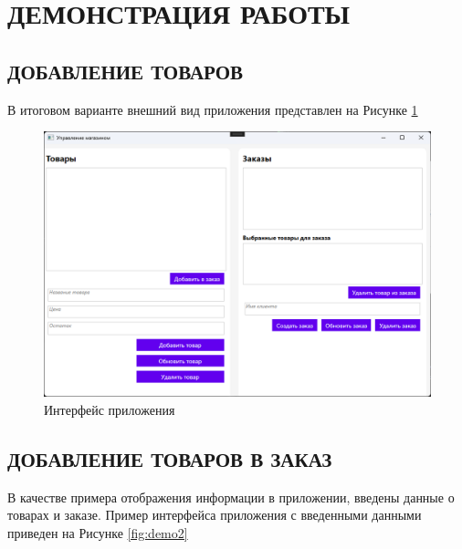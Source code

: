\documentclass[12pt]{article}
\numberwithin{listing}{section}
\numberwithin{figure}{section}
\begin{document}
\pagebreak

\section{ДЕМОНСТРАЦИЯ РАБОТЫ}

\subsection{ДОБАВЛЕНИЕ ТОВАРОВ}

В итоговом варианте внешний вид приложения представлен на Рисунке \ref{fig:demo1}

\begin{figure}[ht]
	\centering
	\includegraphics[width=1.0\textwidth]{fig/image 26.png}
	\caption{Интерфейс приложения}
	\label{fig:demo1}
\end{figure}

\pagebreak


\subsection{ДОБАВЛЕНИЕ ТОВАРОВ В ЗАКАЗ}

В качестве примера отображения информации в приложении, введены данные о товарах и заказе. Пример интерфейса приложения с введенными данными приведен на Рисунке \ref{fig:demo2}
\end{document}
